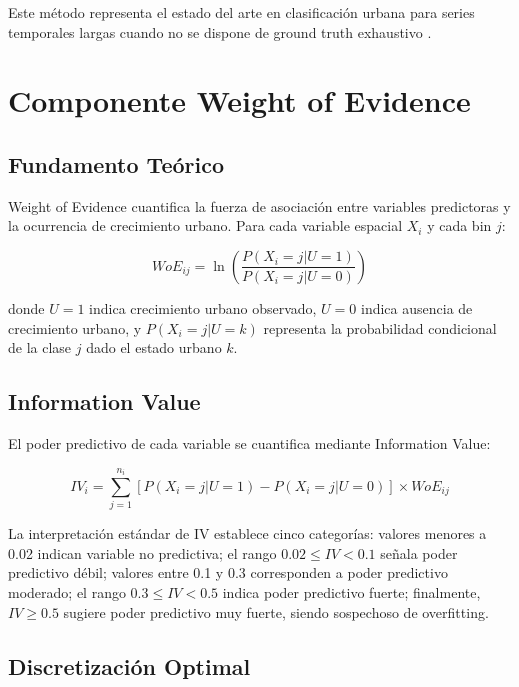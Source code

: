 Este método representa el estado del arte en clasificación urbana para series temporales largas cuando no se dispone de ground truth exhaustivo \parencite{Ma2019}.

\section{Componente Weight of Evidence}

\subsection{Fundamento Teórico}

Weight of Evidence \parencite{BonhamCarter1994} cuantifica la fuerza de asociación entre variables predictoras y la ocurrencia de crecimiento urbano. Para cada variable espacial $X_i$ y cada bin $j$:

\begin{equation}
WoE_{ij} = \ln\left(\frac{P(X_i = j | U = 1)}{P(X_i = j | U = 0)}\right)
\label{eq:woe_definition}
\end{equation}

donde $U = 1$ indica crecimiento urbano observado, $U = 0$ indica ausencia de crecimiento urbano, y $P(X_i = j | U = k)$ representa la probabilidad condicional de la clase $j$ dado el estado urbano $k$.

\subsection{Information Value}

El poder predictivo de cada variable se cuantifica mediante Information Value:

\begin{equation}
IV_i = \sum_{j=1}^{n_i} \left[P(X_i = j | U = 1) - P(X_i = j | U = 0)\right] \times WoE_{ij}
\label{eq:information_value}
\end{equation}

La interpretación estándar de IV establece cinco categorías: valores menores a 0.02 indican variable no predictiva; el rango $0.02 \leq IV < 0.1$ señala poder predictivo débil; valores entre 0.1 y 0.3 corresponden a poder predictivo moderado; el rango $0.3 \leq IV < 0.5$ indica poder predictivo fuerte; finalmente, $IV \geq 0.5$ sugiere poder predictivo muy fuerte, siendo sospechoso de overfitting.

\subsection{Discretización Optimal}

